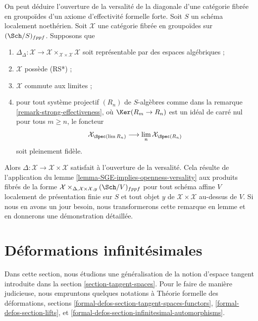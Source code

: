 \begin{remark}
\label{remark-trade-openness-versality-diagonal-with-strong-effectiveness}
On peut déduire l'ouverture de la versalité de la diagonale d'une catégorie
fibrée en groupoïdes d'un axiome d'effectivité formelle forte. Soit $S$ un
schéma localement noethérien. Soit $\mathcal{X}$ une catégorie fibrée en
groupoïdes sur $(\Sch/S)_{fppf}$. Supposons que
\begin{enumerate}
\item $\Delta_\Delta : \mathcal{X} \to
\mathcal{X} \times_{\mathcal{X} \times \mathcal{X}} \mathcal{X}$
soit représentable par des espaces algébriques ;
\item $\mathcal{X}$ possède (RS*) ;
\item $\mathcal{X}$ commute aux limites ;
\item pour tout système projectif $(R_n)$ de $S$-algèbres comme dans la
remarque \ref{remark-strong-effectiveness}, où $\Ker(R_m \to R_n)$ est un
idéal de carré nul pour tous $m \geq n$, le foncteur
$$
\mathcal{X}_{\Spec(\lim R_n)} \longrightarrow
\lim_n \mathcal{X}_{\Spec(R_n)}
$$
soit pleinement fidèle.
\end{enumerate}
Alors $\Delta : \mathcal{X} \to \mathcal{X} \times \mathcal{X}$ satisfait
à l'ouverture de la versalité. Cela résulte de l'application du lemme
\ref{lemma-SGE-implies-openness-versality} aux produits fibrés de la forme
$\mathcal{X} \times_{\Delta, \mathcal{X} \times \mathcal{X}, y}
(\Sch/V)_{fppf}$ pour tout schéma affine $V$ localement de présentation finie
sur $S$ et tout objet $y$ de $\mathcal{X} \times \mathcal{X}$ au-dessus de
$V$. Si nous en avons un jour besoin, nous transformerons cette remarque en
lemme et en donnerons une démonstration détaillée.
\end{remark}











\section{Déformations infinitésimales}
\label{section-inf}

\noindent
Dans cette section, nous étudions une généralisation de la notion d'espace
tangent introduite dans la section \ref{section-tangent-spaces}. Pour le faire
de manière judicieuse, nous empruntons quelques notations à Théorie formelle
des déformations, sections
\ref{formal-defos-section-tangent-spaces-functors},
\ref{formal-defos-section-lifts}, et
\ref{formal-defos-section-infinitesimal-automorphisms}.

